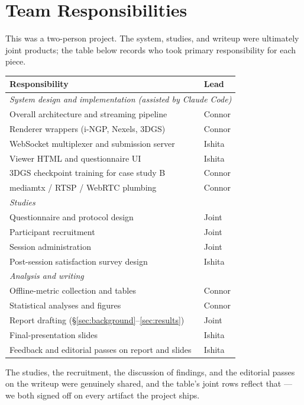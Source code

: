 
\section{Team Responsibilities}
\label{sec:team}

This was a two-person project. The system, studies, and writeup were
ultimately joint products; the table below records who took primary
responsibility for each piece.

\begin{table}[h]
\centering
\small
\setlength{\tabcolsep}{6pt}
\begin{tabular}{l l}
\toprule
Responsibility & Lead \\
\midrule
\multicolumn{2}{l}{\emph{System design and implementation (assisted by Claude Code)}} \\
\quad Overall architecture and streaming pipeline                & Connor \\
\quad Renderer wrappers (i-NGP, Nexels, 3DGS)                    & Connor \\
\quad WebSocket multiplexer and submission server                & Ishita \\
\quad Viewer HTML and questionnaire UI                           & Ishita \\
\quad 3DGS checkpoint training for case study B                  & Connor \\
\quad mediamtx / RTSP / WebRTC plumbing                          & Connor \\
\midrule
\multicolumn{2}{l}{\emph{Studies}} \\
\quad Questionnaire and protocol design                          & Joint \\
\quad Participant recruitment                                    & Joint \\
\quad Session administration                                     & Joint \\
\quad Post-session satisfaction survey design                    & Ishita \\
\midrule
\multicolumn{2}{l}{\emph{Analysis and writing}} \\
\quad Offline-metric collection and tables                       & Connor \\
\quad Statistical analyses and figures                           & Connor \\
\quad Report drafting (\S\ref{sec:background}--\ref{sec:results}) & Joint \\
\quad Final-presentation slides                                  & Ishita \\
\quad Feedback and editorial passes on report and slides         & Ishita \\
\bottomrule
\end{tabular}
\end{table}

The studies, the recruitment, the discussion of findings, and the
editorial passes on the writeup were genuinely shared, and the table's
joint rows reflect that --- we both signed off on every artifact the
project ships.
